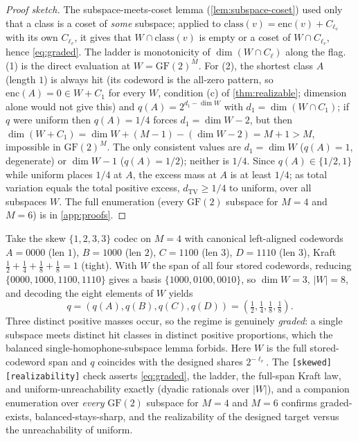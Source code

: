 \documentclass[acmsmall,review]{acmart}
\newcommand{\enc}{\mathrm{enc}}
\newcommand{\TV}{d_{\mathrm{TV}}}
\newcommand{\GF}{\mathrm{GF}(2)}
\newcommand{\class}{\mathrm{class}}
\newcommand{\W}{W}                          %
\newcommand{\inter}{\cap}
\begin{document}
\begin{proof}[Proof sketch]
The subspace-meets-coset lemma (\cref{lem:subspace-coset}) used only that a class is a
coset of \emph{some} subspace; applied to $\class(v) = \enc(v) + C_{\ell_v}$ with its own
$C_{\ell_v}$, it gives that $\W \inter \class(v)$ is empty or a coset of $\W \inter
C_{\ell_v}$, hence \eqref{eq:graded}. The ladder is monotonicity of
$\dim(\W \inter C_\ell)$ along the flag. (1) is the direct evaluation at $\W = \GF^M$.
For (2), the shortest class $A$ (length $1$) is always hit (its codeword is the
all-zero pattern, so $\enc(A) = 0 \in \W + C_1$ for every $\W$, condition (c) of
\cref{thm:realizable}; dimension alone would not give this) and $q(A) = 2^{d_1 - \dim \W}$
with $d_1 = \dim(\W \inter C_1)$; if $q$ were uniform then $q(A) = 1/4$ forces $d_1 =
\dim \W - 2$, but then $\dim(\W + C_1) = \dim \W + (M-1) - (\dim \W - 2) = M + 1 > M$,
impossible in $\GF^M$. The only consistent values are $d_1 = \dim \W$ ($q(A) = 1$,
degenerate) or $\dim \W - 1$ ($q(A) = 1/2$); neither is $1/4$. Since $q(A) \in \{1/2, 1\}$
while uniform places $1/4$ at $A$, the excess mass at $A$ is at least $1/4$; as total variation
equals the total positive excess, $\TV \ge 1/4$ to uniform, over all
subspaces $\W$. The full enumeration (every $\GF$ subspace for $M = 4$ and $M = 6$) is in
\cref{app:proofs}.
\end{proof}

\begin{example}
\label{ex:graded}
Take the skew $\{1,2,3,3\}$ codec on $M = 4$ with canonical left-aligned codewords $A =
0000$ (len $1$), $B = 1000$ (len $2$), $C = 1100$ (len $3$), $D = 1110$ (len $3$), Kraft
$\tfrac12 + \tfrac14 + \tfrac18 + \tfrac18 = 1$ (tight). With $\W$ the span of all four
stored codewords, reducing $\{0000, 1000, 1100, 1110\}$ gives a basis $\{1000, 0100,
0010\}$, so $\dim \W = 3$, $|\W| = 8$, and decoding the eight elements of $\W$ yields
\[
  q = (q(A), q(B), q(C), q(D)) = (\tfrac12, \tfrac14, \tfrac18, \tfrac18).
\]
Three distinct positive masses occur, so the regime is genuinely \emph{graded}: a single
subspace meets distinct hit classes in distinct positive proportions, which the balanced
single-homophone-subspace lemma forbids. Here $\W$ is the full stored-codeword span and
$q$ coincides with the designed shares $2^{-\ell_v}$. The \texttt{[skewed][realizability]}
check asserts \eqref{eq:graded}, the ladder, the full-span Kraft law, and uniform-unreachability
exactly (dyadic rationals over $|\W|$), and a companion enumeration over \emph{every}
$\GF$ subspace for $M = 4$ and $M = 6$ confirms graded-exists, balanced-stays-sharp, and
the realizability of the designed target versus the unreachability of uniform.
\end{example}
\end{document}
